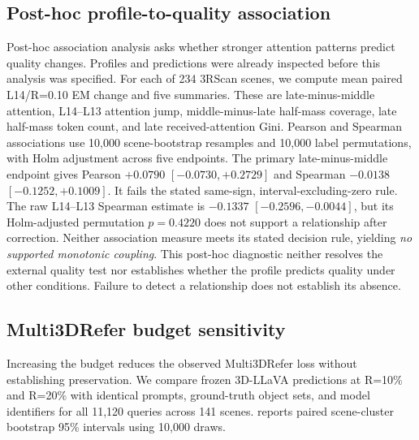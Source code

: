 \subsection{Post-hoc profile-to-quality association}
\label{sec:supp_coupling}
Post-hoc association analysis asks whether stronger attention patterns predict quality changes. Profiles and predictions were already inspected before this analysis was specified. For each of 234 3RScan scenes, we compute mean paired L14/R=0.10 EM change and five summaries. These are late-minus-middle attention, L14--L13 attention jump, middle-minus-late half-mass coverage, late half-mass token count, and late received-attention Gini. Pearson and Spearman associations use 10,000 scene-bootstrap resamples and 10,000 label permutations, with Holm adjustment across five endpoints. The primary late-minus-middle endpoint gives Pearson $+0.0790$ $[-0.0730,+0.2729]$ and Spearman $-0.0138$ $[-0.1252,+0.1009]$. It fails the stated same-sign, interval-excluding-zero rule. The raw L14--L13 Spearman estimate is $-0.1337$ $[-0.2596,-0.0044]$, but its Holm-adjusted permutation $p=0.4220$ does not support a relationship after correction. Neither association measure meets its stated decision rule, yielding \emph{no supported monotonic coupling}. This post-hoc diagnostic neither resolves the external quality test nor establishes whether the profile predicts quality under other conditions. Failure to detect a relationship does not establish its absence.

\subsection{Multi3DRefer budget sensitivity}
Increasing the budget reduces the observed Multi3DRefer loss without establishing preservation. We compare frozen 3D-LLaVA predictions at R=10\% and R=20\% with identical prompts, ground-truth object sets, and model identifiers for all 11,120 queries across 141 scenes.  reports paired scene-cluster bootstrap 95\% intervals using 10,000 draws.

\begin{table}[t]
\centering
\caption{Multi3DRefer budget sensitivity. Deltas are candidate minus reference in mIoU points on the inspected benchmark.}
\label{tab:supp_multi3drefer_budget}
\end{table}

